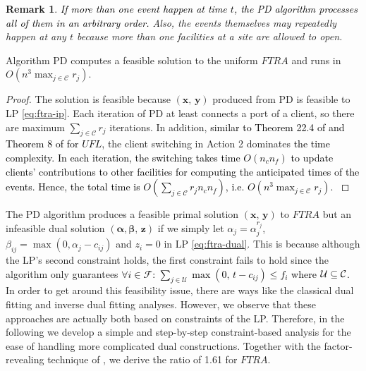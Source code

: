 \documentclass[10pt]{llncs}
\newtheorem{rem}{Remark}
\begin{document}
\begin{rem} \textcolor{black}{If more than one event happen at time
$t$, the PD algorithm processes all of them in an arbitrary order.}
Also, the events themselves may repeatedly happen at any $t$ because
more than one facilities at a site are allowed to open.\end{rem}
\begin{lemma}
Algorithm PD computes a feasible solution to the uniform $FTRA$ and
runs in $O\left(n^{3}\max_{j\in\mathcal{C}}r_{j}\right)$.\label{lem:time-PD}\end{lemma}
\begin{proof}
The solution is feasible because $\left(\boldsymbol{x},\,\boldsymbol{y}\right)$
produced from PD is feasible to LP \eqref{eq:ftra-ip}. Each iteration
of PD at least connects a port of a client, so there are maximum $\sum_{j\in\mathcal{C}}r_{j}$
iterations. In addition, \textcolor{black}{similar to Theorem 22.4
of \cite{JensVygenFL06Book} and Theorem 8 of \cite{jain01approximation}
for $UFL$, }the client switching in Action 2 dominates\textcolor{black}{{}
the time complexity. In each iteration, the switching takes time $O\left(n_{c}n_{f}\right)$
to update clients' contributions to other facilities for computing
the anticipated times of the events. Hence, the total time is $O\left(\sum_{j\in\mathcal{C}}r_{j}n_{c}n_{f}\right)$,
i.e. $O\left(n^{3}\max_{j\in\mathcal{C}}r_{j}\right)$.\medskip{}
}
\end{proof}
The PD algorithm produces a feasible primal solution $\left(\boldsymbol{x},\,\boldsymbol{y}\right)$
to $FTRA$ but an infeasible dual solution $\left(\boldsymbol{\alpha},\boldsymbol{\beta},\,\boldsymbol{z}\right)$
if we simply let $\alpha_{j}=\alpha_{j}^{r_{j}}$, $\beta_{ij}=\max\left(0,\alpha_{j}-c_{ij}\right)$
and $z_{i}=0$ in LP \eqref{eq:ftra-dual}. This is because although
the LP's second constraint holds, the first constraint fails to hold
since the algorithm only guarantees \textcolor{black}{$\forall i\in\mathcal{F}$:
$\sum_{j\in\mathcal{U}}\max\left(0,\, t-c_{ij}\right)$$\leq f_{i}$
where $\mathcal{U}\subseteq{\cal C}$.} In order to get around this
feasibility issue, there are ways like the classical dual fitting
\cite{Jain03dualfitting} and inverse dual fitting \cite{shihongftfa}
analyses. However, we observe that these approaches are actually both
based on constraints of the LP. Therefore, in the following we develop
a simple and step-by-step constraint-based analysis for the ease of
handling more complicated dual constructions. Together with the factor-revealing
technique of \cite{Jain03dualfitting}, we derive the ratio of 1.61
for $FTRA$.
\end{document}
